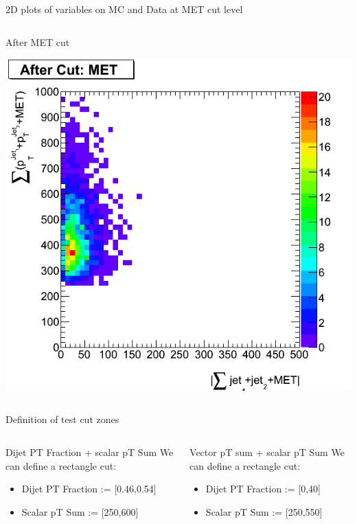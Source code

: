 \documentclass[8pt]{beamer}
\begin{document}
\begin{frame}{2D plots of variables on MC and Data at MET cut level}
\begin{columns}
\begin{block}{After MET cut}
  \begin{center}
  \includegraphics[width=1.00\textwidth]{img/MET_vecSum_htMET_VBFInv.png}
  \end{center}

\end{block}
  
\end{columns}
 
\end{frame}

\begin{frame}{Definition of test cut zones}

\begin{columns}
 

\column[t]{5.5cm}   
\begin{block}{Dijet PT Fraction + scalar pT Sum}
We can define a rectangle cut:
\begin{itemize}
  \item Dijet PT Fraction := [0.46,0.54]
  \item Scalar pT Sum := [250,600]
\end{itemize}

\end{block}

\begin{block}{Vector pT sum + scalar pT Sum}
 We can define a rectangle cut:
\begin{itemize}
  \item Dijet PT Fraction := [0,40]
  \item Scalar pT Sum := [250,550]
\end{itemize}

\end{block}

\end{columns}

\end{frame}
\end{document}
